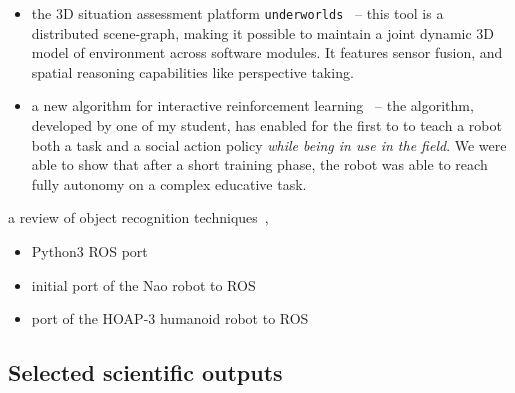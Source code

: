 \begin{itemize}
    \item the 3D situation assessment platform
        \texttt{underworlds}~\autocite{lemaignan2018underworlds} -- this tool
        is a distributed scene-graph, making it possible to maintain a joint
        dynamic 3D model of environment across software modules. It features
        sensor fusion, and spatial reasoning capabilities like perspective
        taking.

    \item a new algorithm for interactive reinforcement
        learning~\autocite{senft2017supervised} -- the algorithm, developed by
        one of my student, has enabled for the first to to teach a robot both a
        task and a social action policy \emph{while being in use in the field}.
        We were able to show that after a short training phase, the robot was
        able to reach fully autonomy on a complex educative task.
\end{itemize}

     a review of object recognition
techniques~\autocite{wallbridge2017qualitative}, 

\begin{itemize}
    \item Python3 ROS port
    \item initial port of the Nao robot to ROS
    \item port of the HOAP-3 humanoid robot to ROS
\end{itemize}


\subsection{Selected scientific outputs}

